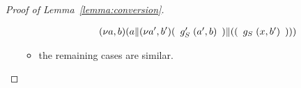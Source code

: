 \begin{proof}[Proof of Lemma~\ref{lemma:conversion}]
\begin{enumerate}
\begin{itemize}
\begin{align*}
          \PScope ({\PPar {a} {\PScope[a',b'] \PPar {(
          \begin{array}[t]{l}
          g'_S \; (a', b)
          \end{array}
        )} {({ (
        \begin{array}[t]{l}
        g_S \; (x, b')
        \end{array}
        ) })}}})  \\
      \end{align*}
    \item the remaining cases are similar.
    \end{itemize}
  \end{enumerate}
\end{proof}




